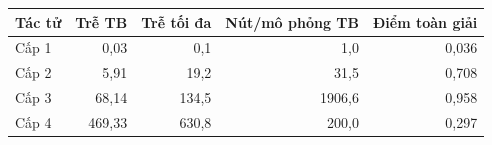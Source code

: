 \begin{tabular}{l r r r r}
\toprule
Tác tử & Trễ TB & Trễ tối đa & Nút/mô phỏng TB & Điểm toàn giải \\
\midrule
Cấp 1 & 0,03 & 0,1 & 1,0 & 0,036 \\
Cấp 2 & 5,91 & 19,2 & 31,5 & 0,708 \\
Cấp 3 & 68,14 & 134,5 & 1906,6 & 0,958 \\
Cấp 4 & 469,33 & 630,8 & 200,0 & 0,297 \\
\bottomrule
\end{tabular}

